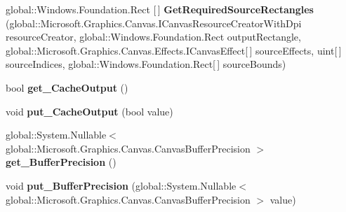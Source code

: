 \begin{DoxyCompactItemize}
\item 
\mbox{\label{interface_microsoft_1_1_graphics_1_1_canvas_1_1_effects_1_1_i_canvas_effect_a164d8438529055d00d8f6ed3b12c4539}} 
global\+::\+Windows.\+Foundation.\+Rect \mbox{[}$\,$\mbox{]} {\bfseries Get\+Required\+Source\+Rectangles} (global\+::\+Microsoft.\+Graphics.\+Canvas.\+I\+Canvas\+Resource\+Creator\+With\+Dpi resource\+Creator, global\+::\+Windows.\+Foundation.\+Rect output\+Rectangle, global\+::\+Microsoft.\+Graphics.\+Canvas.\+Effects.\+I\+Canvas\+Effect\mbox{[}$\,$\mbox{]} source\+Effects, uint\mbox{[}$\,$\mbox{]} source\+Indices, global\+::\+Windows.\+Foundation.\+Rect\mbox{[}$\,$\mbox{]} source\+Bounds)
\item 
\mbox{\label{interface_microsoft_1_1_graphics_1_1_canvas_1_1_effects_1_1_i_canvas_effect_ade35aa78196aaa6fe9447696abb6d07f}} 
bool {\bfseries get\+\_\+\+Cache\+Output} ()
\item 
\mbox{\label{interface_microsoft_1_1_graphics_1_1_canvas_1_1_effects_1_1_i_canvas_effect_a83327dc0bb363f6f878802f5c971c033}} 
void {\bfseries put\+\_\+\+Cache\+Output} (bool value)
\item 
\mbox{\label{interface_microsoft_1_1_graphics_1_1_canvas_1_1_effects_1_1_i_canvas_effect_acbbcd7b5f2c9c1556c6ae4851cb48afa}} 
global\+::\+System.\+Nullable$<$ global\+::\+Microsoft.\+Graphics.\+Canvas.\+Canvas\+Buffer\+Precision $>$ {\bfseries get\+\_\+\+Buffer\+Precision} ()
\item 
\mbox{\label{interface_microsoft_1_1_graphics_1_1_canvas_1_1_effects_1_1_i_canvas_effect_ac02a7bea19253c3a3cf5522b88da9a92}} 
void {\bfseries put\+\_\+\+Buffer\+Precision} (global\+::\+System.\+Nullable$<$ global\+::\+Microsoft.\+Graphics.\+Canvas.\+Canvas\+Buffer\+Precision $>$ value)
\item 
\mbox{\label{interface_microsoft_1_1_graphics_1_1_canvas_1_1_effects_1_1_i_canvas_effect_aa08a935649c3289f85829be386bd22e0}} 

\end{DoxyCompactItemize}
